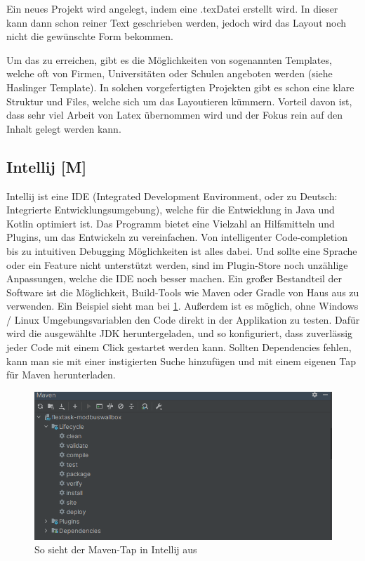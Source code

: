   

Ein neues Projekt wird angelegt, indem eine \grq.tex\grq Datei erstellt wird. In dieser kann dann schon reiner Text geschrieben werden, jedoch wird das Layout noch nicht die gewünschte Form bekommen.    

Um das zu erreichen, gibt es die Möglichkeiten von sogenannten Templates, welche oft von Firmen, Universitäten oder Schulen angeboten werden (siehe Haslinger Template). In solchen vorgefertigten Projekten gibt es schon eine klare Struktur und Files, welche sich um das Layoutieren kümmern. Vorteil davon ist, dass sehr viel Arbeit von Latex übernommen wird und der Fokus rein auf den Inhalt gelegt werden kann. 


\subsection{Intellij [M]} 

Intellij ist eine IDE (Integrated Development Environment, oder zu Deutsch: Integrierte Entwicklungsumgebung), welche für die Entwicklung in Java und Kotlin optimiert ist. Das Programm bietet eine Vielzahl an Hilfsmitteln und Plugins, um das Entwickeln zu vereinfachen. Von intelligenter Code-completion bis zu intuitiven Debugging Möglichkeiten ist alles dabei.  Und sollte eine Sprache oder ein Feature nicht unterstützt werden, sind im Plugin-Store noch unzählige Anpassungen, welche die IDE noch besser machen. Ein großer Bestandteil der Software ist die Möglichkeit, Build-Tools wie Maven oder Gradle von Haus aus zu verwenden. Ein Beispiel sieht man bei \ref{fig:impl:WallboxMavenTap}. Außerdem ist es möglich, ohne Windows / Linux Umgebungsvariablen den Code direkt in der Applikation zu testen. Dafür wird die ausgewählte JDK heruntergeladen, und so konfiguriert, dass zuverlässig jeder Code mit einem Click gestartet werden kann. Sollten Dependencies fehlen, kann man sie mit einer instigierten Suche hinzufügen und mit einem eigenen Tap für Maven herunterladen. 

\begin{figure}[h t]
    \centering
    \includegraphics[scale=0.55]{pics/MavenOverfiew.png}
    \caption{So sieht der Maven-Tap in Intellij aus}
    \label{fig:impl:WallboxMavenTap}
  \end{figure}

